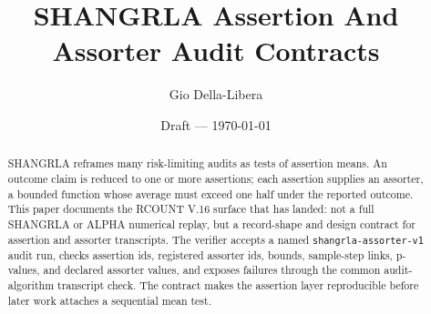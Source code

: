 \documentclass[12pt]{article}
\title{SHANGRLA Assertion And Assorter Audit Contracts}
\author{Gio Della-Libera}
\date{Draft --- \today}
\begin{document}
\maketitle

\begin{abstract}
SHANGRLA reframes many risk-limiting audits as tests of assertion means. An
outcome claim is reduced to one or more assertions; each assertion supplies an
assorter, a bounded function whose average must exceed one half under the
reported outcome. This paper documents the RCOUNT V.16 surface that has landed:
not a full SHANGRLA or ALPHA numerical replay, but a record-shape and design
contract for assertion and assorter transcripts. The verifier accepts a named
\texttt{shangrla-assorter-v1} audit run, checks assertion ids, registered
assorter ids, bounds, sample-step links, p-values, and declared assorter values,
and exposes failures through the common audit-algorithm transcript check. The
contract makes the assertion layer reproducible before later work attaches a
sequential mean test.
\end{abstract}








\nocite{rcount-overview-2026,stark-shangrla-2020}


\end{document}
